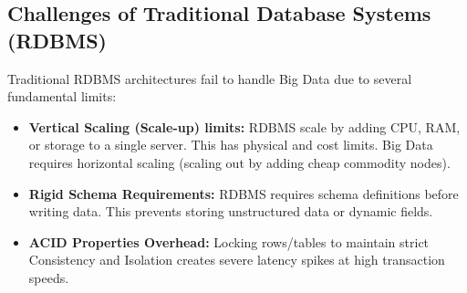 \documentclass[12pt,a4paper]{article}
\begin{document}
\begin{tcolorbox}[tikzbox, title={The 5Vs of Big Data}]
\centering
{}
\end{tcolorbox}

\subsection{Challenges of Traditional Database Systems (RDBMS)}
Traditional RDBMS architectures fail to handle Big Data due to several fundamental limits:
\begin{itemize}[leftmargin=*, itemsep=3pt]
  \item \textbf{Vertical Scaling (Scale-up) limits:} RDBMS scale by adding CPU, RAM, or storage to a single server. This has physical and cost limits. Big Data requires horizontal scaling (scaling out by adding cheap commodity nodes).
  \item \textbf{Rigid Schema Requirements:} RDBMS requires schema definitions before writing data. This prevents storing unstructured data or dynamic fields.
  \item \textbf{ACID Properties Overhead:} Locking rows/tables to maintain strict Consistency and Isolation creates severe latency spikes at high transaction speeds.
\end{itemize}

\end{document}
